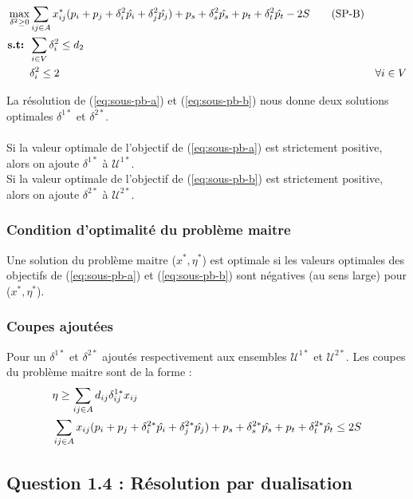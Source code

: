 \documentclass{article}
\begin{document}
\begin{align}
  \max_{\delta^{2} \geq 0} & \sum_{ij \in A} x^*_{ij}(p_i + p_j + \delta_{i}^{2} \hat{p_i} + \delta_{j}^{2} \hat{p_j}) + p_s + \delta_{s}^{2} \hat{p_s} + p_t + \delta_{t}^{2} \hat{p_t} - 2S \tag{SP-B} \label{eq:sous-pb-b}\\
  \textbf{s.t: } & \sum_{i \in V} \delta^{2}_{i} \leq d_2 \notag \\
  &\delta^{2}_{i} \leq 2 & \forall i \in V \notag
\end{align}

La résolution de (\ref{eq:sous-pb-a}) et (\ref{eq:sous-pb-b}) nous donne deux solutions optimales $\delta^{1*}$ et $\delta^{2*}$. \\
\\
Si la valeur optimale de l'objectif de (\ref{eq:sous-pb-a}) est strictement positive, alors on ajoute $\delta^{1*}$ à $\mathcal{U}^{1*}$. \\
Si la valeur optimale de l'objectif de (\ref{eq:sous-pb-b}) est strictement positive, alors on ajoute $\delta^{2*}$ à $\mathcal{U}^{2*}$.

\subsubsection{Condition d'optimalité du problème maitre}
Une solution du problème maitre ($x^*, \eta^*$) est optimale si les valeurs optimales des objectifs de (\ref{eq:sous-pb-a}) et (\ref{eq:sous-pb-b}) sont négatives (au sens large) pour ($x^*, \eta^*$).

\subsubsection{Coupes ajoutées}

Pour un  $\delta^{1*}$ et $\delta^{2*}$ ajoutés respectivement aux ensembles $\mathcal{U}^{1*}$ et $\mathcal{U}^{2*}$. Les coupes du problème maitre sont de la forme : 
\begin{align}
  & \eta \geq \sum_{ij \in A} d_{ij} \delta_{ij}^{1*} x_{ij} \notag \\
  & \sum_{ij \in A} x_{ij}(p_i + p_j + \delta_{i}^{2*} \hat{p_i} + \delta_{j}^{2*} \hat{p_j}) + p_s + \delta_{s}^{2*} \hat{p_s} + p_t + \delta_{t}^{2*} \hat{p_t} \leq 2S \notag
\end{align}


\subsection{Question 1.4 : Résolution par dualisation}
\end{document}
